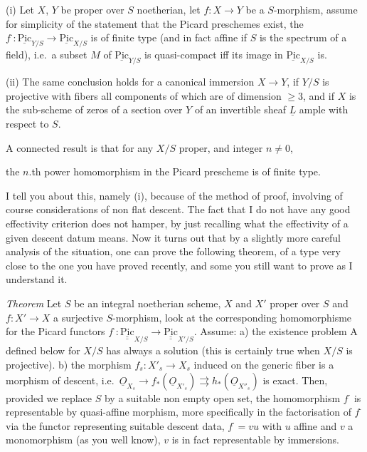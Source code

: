 \documentclass[11pt,a4paper]{article}
\begin{document}
(i) Let $X$, $Y$ be proper over $S$ noetherian, let $f\colon X \to Y$ be a  $S$-morphism, \struck{\ill{}} assume for simplicity of the statement that the Picard preschemes exist, the $f^{\cdot}\colon \underline{\mathrm{Pic}}_{Y/S} \to \underline{\mathrm{Pic}}_{X/S}$ is of finite type (and in fact affine if $S$ is the spectrum of a field), i.e.\ a subset $M$ of $\underline{\mathrm{Pic}}_{Y/S}$ is quasi-compact iff its image in $\underline{\mathrm{Pic}}_{X/S}$ is.

(ii) The same conclusion holds for a canonical immersion $X \to Y$, if $Y/S$ is projective with fibers all components of which are of dimension $\geqslant 3$, and if $X$ is the sub-scheme of zeros of a section over $Y$ of an invertible sheaf $\underline{L}$ ample with respect to $S$.

A connected result is that for any $X/S$ proper, and integer $n \neq 0$,

the $n$.th power homomorphism in the Picard prescheme is of finite type.

I tell you about this, namely (i), because of the method of proof, involving of course considerations of non flat descent. The fact that I do not have any good effectivity criterion does not hamper, by just recalling what the effectivity of a given descent datum means.  Now it turns out that by a slightly more careful analysis of the situation, one can prove the following theorem, of a type very close to the one you have proved recently, and  some you still want to prove as I understand it.

\emph{Theorem} Let $S$ be an integral noetherian scheme, $X$ and $X'$ proper over $S$ and $f\colon X' \to X$ a surjective $S$-morphism, look at the corresponding homomorphisme for the Picard functors $f^{\cdot}\colon \underline{\underline{\mathrm{Pic}}}_{X/S} \to \underline{\underline{\mathrm{Pic}}}_{X'/S}$. Assume: a) the existence problem A  defined below for $X/S$ has always a solution (this is certainly true when $X/S$ is projective). b) the morphism $f_s\colon X'_s \to X_s$ induced on the generic fiber is a morphism of descent, i.e.\ $\underline{O}_{X_s} \to f_{*}(\underline{O}_{X'_s}) \rightrightarrows h_{*}(\underline{O}_{X''_s})$ is exact. Then, provided we replace $S$ by a suitable non empty open set, the homomorphism $f^{\cdot}$ is representable by  quasi-affine morphism, more specifically  in the factorisation of $f^{\cdot}$ via the functor representing suitable descent data, $f^{\cdot} = vu$ with $u$ affine \struck{\ill{}} and $v$ a monomorphism (as you well know), $v$ is in fact representable by  immersions.
\end{document}
